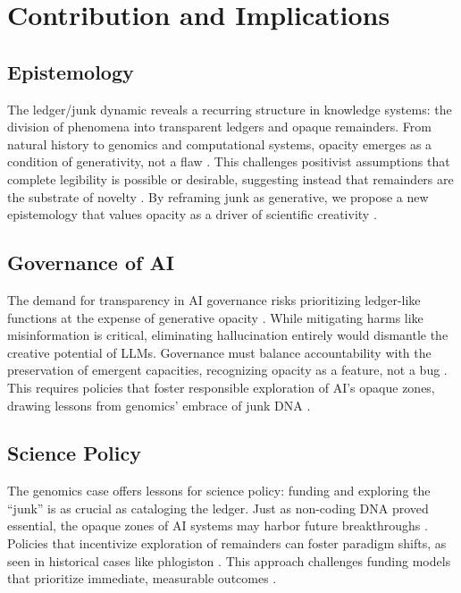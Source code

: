 \documentclass[11pt]{article}
\begin{document}
\section{Contribution and Implications}

\subsection{Epistemology}
The ledger/junk dynamic reveals a recurring structure in knowledge systems: the division of phenomena into transparent ledgers and opaque remainders. From natural history to genomics and computational systems, opacity emerges as a condition of generativity, not a flaw \citep{kuhn1962, rheinberger1997}. This challenges positivist assumptions that complete legibility is possible or desirable, suggesting instead that remainders are the substrate of novelty \citep{barad2007, shapin1985}. By reframing junk as generative, we propose a new epistemology that values opacity as a driver of scientific creativity \citep{bowker2005, collins1992}.

\subsection{Governance of AI}
The demand for transparency in AI governance risks prioritizing ledger-like functions at the expense of generative opacity \citep{burrell2016}. While mitigating harms like misinformation is critical, eliminating hallucination entirely would dismantle the creative potential of LLMs. Governance must balance accountability with the preservation of emergent capacities, recognizing opacity as a feature, not a bug \citep{jasanoff2004, glissant1997}. This requires policies that foster responsible exploration of AI’s opaque zones, drawing lessons from genomics’ embrace of junk DNA \citep{pennisi2012}.

\subsection{Science Policy}
The genomics case offers lessons for science policy: funding and exploring the ``junk'' is as crucial as cataloging the ledger. Just as non-coding DNA proved essential, the opaque zones of AI systems may harbor future breakthroughs \citep{keller2000, encode2012}. Policies that incentivize exploration of remainders can foster paradigm shifts, as seen in historical cases like phlogiston \citep{shapin1985, kuhn1962}. This approach challenges funding models that prioritize immediate, measurable outcomes \citep{bowker2005, star1989}.
\end{document}
